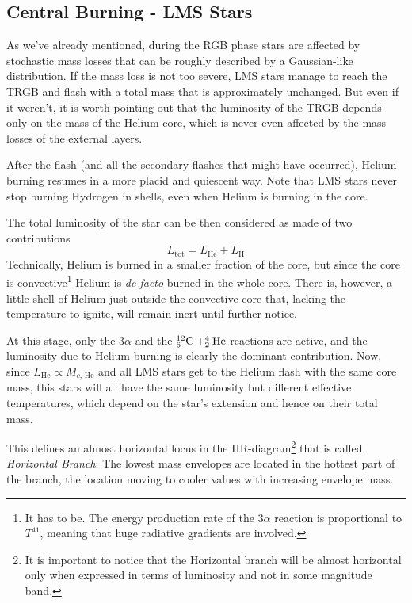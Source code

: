 \subsection{Central Burning - LMS Stars}

As we've already mentioned, during the RGB phase stars are affected by stochastic mass losses that can be roughly described by a Gaussian-like distribution. If the mass loss is not too severe, LMS stars manage to reach the TRGB and flash with a total mass that is approximately unchanged. But even if it weren't, it is worth pointing out that the luminosity of the TRGB depends only on the mass of the Helium core, which is never even affected by the mass losses of the external layers.
\par After the flash (and all the secondary flashes that might have occurred), Helium burning resumes in a more placid and quiescent way. Note that LMS stars never stop burning Hydrogen in shells, even when Helium is burning in the core.
\par The total luminosity of the star can be then considered as made of two contributions
\begin{equation*}
    L_{\text{tot}} = L_{\text{He}} + L_{\text{H}}
\end{equation*}
Technically, Helium is burned in a smaller fraction of the core, but since the core is convective\footnote{It has to be. The energy production rate of the $3\alpha$ reaction is proportional to $T^{41}$, meaning that huge radiative gradients are involved.} Helium is \emph{de facto} burned in the whole core. There is, however, a little shell of Helium just outside the convective core that, lacking the temperature to ignite, will remain inert until further notice.
\par At this stage, only the $3\alpha$ and the $\element{C}{12}{6}+\element{He}{4}{2}$ reactions are active, and the luminosity due to Helium burning is clearly the dominant contribution. Now, since $L_{\text{He}}\propto M_{c,\,\text{He}}$ and all LMS stars get to the Helium flash with the same core mass, this stars will all have the same luminosity but different effective temperatures, which depend on the star's extension and hence on their total mass.
\par This defines an almost horizontal locus in the HR-diagram\footnote{It is important to notice that the Horizontal branch will be almost horizontal only when expressed in terms of luminosity and not in some magnitude band.} that is called \emph{Horizontal Branch}: The lowest mass envelopes are located in the hottest part of the branch, the location moving to cooler values with increasing envelope mass.
